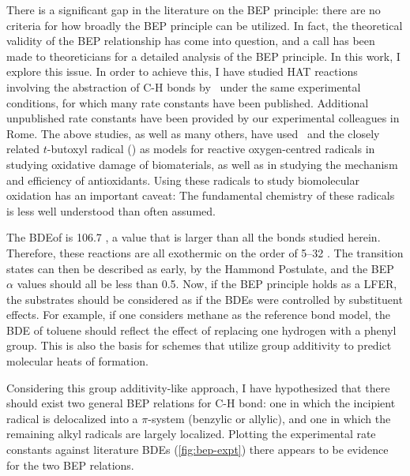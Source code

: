 There is a significant gap in the literature on the BEP principle: there are no criteria for how broadly the BEP principle can be utilized. In fact, the theoretical validity of the BEP relationship has come into question, and a call has been made to theoreticians for a detailed analysis of the BEP principle.\cite{vanSanten2010} In this work, I explore this issue. In order to achieve this, I have studied HAT reactions involving the abstraction of C-H bonds by \cumo\ under the same experimental conditions, for which many rate constants have been published.\cite{Bietti2010, Bietti2011, Pischel2001, Salamone2011, Salamone2012, Salamone2012a, Salamone2013, Salamone2015} Additional unpublished rate constants have been provided by our experimental colleagues in Rome. The above studies, as well as many others, have used \cumo\ and the closely related $t$-butoxyl radical () as models for reactive oxygen-centred radicals in studying oxidative damage of biomaterials,\cite{Adam1998, Adam2002, Jones2003} as well as in studying the mechanism and efficiency of antioxidants.\cite{MacFaul1996, Valgimigli1996, Valgimigli1999, Jovanovic1999, Sortino2003} Using these radicals to study biomolecular oxidation has an important caveat: The fundamental chemistry of these radicals is less well understood than often assumed. \cite{Tanko2001, Finn2004, Salamone2011b}

The BDE\footnotemark of  is 106.7 \kcalmol, a value that is larger than all the  bonds studied herein. Therefore, these reactions are all exothermic on the order of 5--32 \kcalmol. The transition states can then be described as early, by the Hammond Postulate, and the BEP $\alpha$ values should all be less than 0.5.\cite{Russell1973} Now, if the BEP principle holds as a LFER, the substrates should be considered as if the BDEs were controlled by substituent effects. For example, if one considers methane as the reference  bond model, the BDE of toluene should reflect the effect of replacing one hydrogen with a phenyl group. This is also the basis for schemes that utilize group additivity to predict molecular heats of formation.\cite{Benson1976}


Considering this group additivity-like approach, I have hypothesized that there should exist two general BEP relations for C-H bond: one in which the incipient radical is delocalized into a $\pi$-system (benzylic or allylic), and one in which the remaining alkyl radicals are largely localized. Plotting the experimental rate constants against literature BDEs (\ref{fig:bep-expt}) there appears to be evidence for the two BEP relations.

